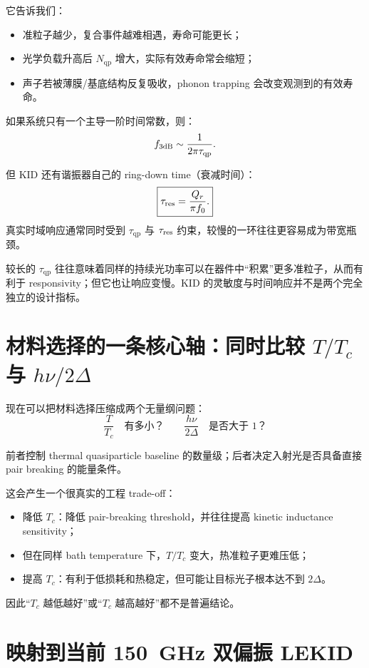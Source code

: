 \documentclass[11pt,a4paper,openany]{ctexrep}
\newcommand{\qp}{\mathrm{qp}}
\begin{document}
它告诉我们：
\begin{itemize}
  \item 准粒子越少，复合事件越难相遇，寿命可能更长；
  \item 光学负载升高后 $N_{\qp}$ 增大，实际有效寿命常会缩短；
  \item 声子若被薄膜/基底结构反复吸收，phonon trapping 会改变观测到的有效寿命。
\end{itemize}

如果系统只有一个主导一阶时间常数，则：
\[
f_{\rm 3dB}\sim\frac{1}{2\pi\tau_{\qp}}.
\]

但 KID 还有谐振器自己的 ring-down time（衰减时间）：
\[
\boxed{
\tau_{\rm res}
=
\frac{Q_r}{\pi f_0}.
}
\]
真实时域响应通常同时受到 $\tau_{\qp}$ 与 $\tau_{\rm res}$ 约束，较慢的一环往往更容易成为带宽瓶颈。

\begin{intuitionbox}
较长的 $\tau_{\qp}$ 往往意味着同样的持续光功率可以在器件中“积累”更多准粒子，从而有利于 responsivity；但它也让响应变慢。KID 的灵敏度与时间响应并不是两个完全独立的设计指标。
\end{intuitionbox}

\section{材料选择的一条核心轴：同时比较 $T/T_c$ 与 $h\nu/2\Delta$}

现在可以把材料选择压缩成两个无量纲问题：
\[
\boxed{
\frac{T}{T_c}\quad\text{有多小？}
}
\qquad
\boxed{
\frac{h\nu}{2\Delta}\quad\text{是否大于 1？}
}
\]

前者控制 thermal quasiparticle baseline 的数量级；后者决定入射光是否具备直接 pair breaking 的能量条件。

这会产生一个很真实的工程 trade-off：
\begin{itemize}
  \item 降低 $T_c$：降低 pair-breaking threshold，并往往提高 kinetic inductance sensitivity；
  \item 但在同样 bath temperature 下，$T/T_c$ 变大，热准粒子更难压低；
  \item 提高 $T_c$：有利于低损耗和热稳定，但可能让目标光子根本达不到 $2\Delta$。
\end{itemize}

因此“$T_c$ 越低越好”或“$T_c$ 越高越好”都不是普遍结论。

\section{映射到当前 \SI{150}{GHz} 双偏振 LEKID}
\end{document}
